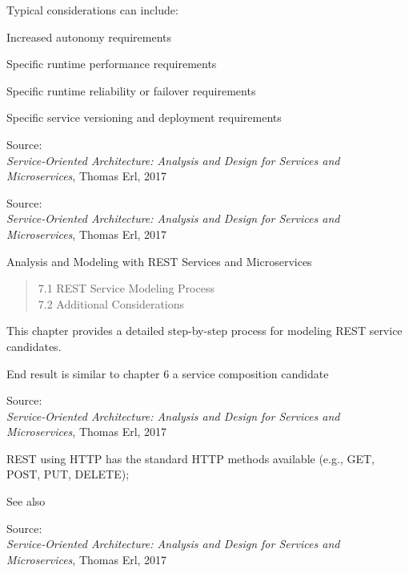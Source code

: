 \documentclass[Screen16to9,17pt]{foils}
\begin{document}
Typical considerations can include:
\begin{list2}
\item Increased autonomy requirements
\item Specific runtime performance requirements
\item Specific runtime reliability or failover requirements
\item Specific service versioning and deployment requirements
\end{list2}
Source: {\footnotesize\\
\emph{Service‑Oriented Architecture: Analysis and Design for Services and Microservices}, Thomas Erl, 2017}



Source: {\footnotesize\\
\emph{Service‑Oriented Architecture: Analysis and Design for Services and Microservices}, Thomas Erl, 2017}



Analysis and Modeling with REST
Services and Microservices

\begin{quote}
7.1 REST Service Modeling Process\\
7.2 Additional Considerations
\end{quote}

\begin{list2}
\item This chapter provides a detailed step-by-step process for modeling REST service
candidates.
\item End result is similar to chapter 6 a service composition candidate
\end{list2}

Source: {\footnotesize\\
\emph{Service‑Oriented Architecture: Analysis and Design for Services and Microservices}, Thomas Erl, 2017}




\begin{list2}
\item REST using HTTP has the standard HTTP methods available (e.g., GET, POST, PUT, DELETE);
\item See also 
\end{list2}
Source: {\footnotesize\\
\emph{Service‑Oriented Architecture: Analysis and Design for Services and Microservices}, Thomas Erl, 2017}
\end{document}

